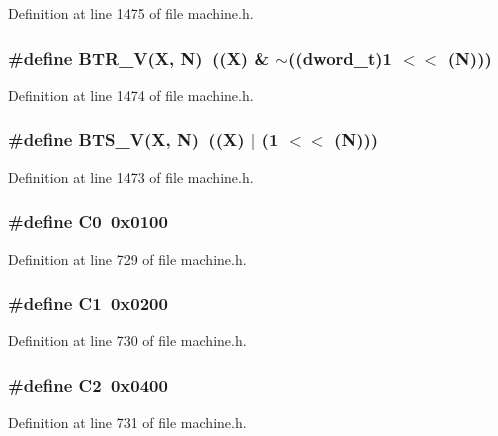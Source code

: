Definition at line 1475 of file machine.h.
\subsubsection[{BTR\_\-V}]{\setlength{\rightskip}{0pt plus 5cm}\#define BTR\_\-V(X, \/  N)~((X) \& $\sim$(({\bf dword\_\-t})1 $<$$<$ (N)))}\label{machine_8h_e1f43b2a6173063f5e88b5646cbe150d}




Definition at line 1474 of file machine.h.
\subsubsection[{BTS\_\-V}]{\setlength{\rightskip}{0pt plus 5cm}\#define BTS\_\-V(X, \/  N)~((X) $|$ (1 $<$$<$ (N)))}\label{machine_8h_09658e3a49c1701a97432061ff5fd77b}




Definition at line 1473 of file machine.h.
\subsubsection[{C0}]{\setlength{\rightskip}{0pt plus 5cm}\#define C0~0x0100}\label{machine_8h_c539c7fe47611738d5320760d4453602}




Definition at line 729 of file machine.h.
\subsubsection[{C1}]{\setlength{\rightskip}{0pt plus 5cm}\#define C1~0x0200}\label{machine_8h_44779f18d87e71c78fc9fbf9dc88537d}




Definition at line 730 of file machine.h.
\subsubsection[{C2}]{\setlength{\rightskip}{0pt plus 5cm}\#define C2~0x0400}\label{machine_8h_d6fc13322a4f1c314332ff34aa8b3fa0}




Definition at line 731 of file machine.h.
